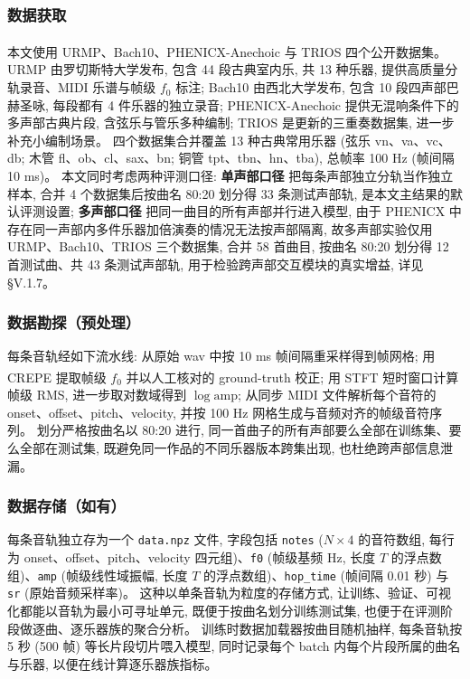 \documentclass[a4paper, UTF8, zihao=-4, fontset=fandol]{ctexart}
\newcommand{\upcite}[1]{\textsuperscript{\cite{#1}}}
\begin{document}
\subsubsection{数据获取}

本文使用 URMP\upcite{urmp}、Bach10\upcite{bach10}、PHENICX-Anechoic 与 TRIOS 四个公开数据集。 URMP 由罗切斯特大学发布, 包含 44 段古典室内乐, 共 13 种乐器, 提供高质量分轨录音、MIDI 乐谱与帧级 $f_0$ 标注; Bach10 由西北大学发布, 包含 10 段四声部巴赫圣咏, 每段都有 4 件乐器的独立录音; PHENICX-Anechoic 提供无混响条件下的多声部古典片段, 含弦乐与管乐多种编制; TRIOS 是更新的三重奏数据集, 进一步补充小编制场景。 四个数据集合并覆盖 13 种古典常用乐器 (弦乐 vn、va、vc、db; 木管 fl、ob、cl、sax、bn; 铜管 tpt、tbn、hn、tba), 总帧率 100 Hz (帧间隔 10 ms)。 本文同时考虑两种评测口径: \textbf{单声部口径} 把每条声部独立分轨当作独立样本, 合并 4 个数据集后按曲名 80:20 划分得 33 条测试声部轨, 是本文主结果的默认评测设置; \textbf{多声部口径} 把同一曲目的所有声部并行进入模型, 由于 PHENICX 中存在同一声部内多件乐器加倍演奏的情况无法按声部隔离, 故多声部实验仅用 URMP、Bach10、TRIOS 三个数据集, 合并 58 首曲目, 按曲名 80:20 划分得 12 首测试曲、共 43 条测试声部轨, 用于检验跨声部交互模块的真实增益, 详见 §V.1.7。

\subsubsection{数据勘探（预处理）}

每条音轨经如下流水线: 从原始 wav 中按 10 ms 帧间隔重采样得到帧网格; 用 CREPE\upcite{crepe} 提取帧级 $f_0$ 并以人工核对的 ground-truth 校正; 用 STFT 短时窗口计算帧级 RMS, 进一步取对数域得到 $\log\mathrm{amp}$; 从同步 MIDI 文件解析每个音符的 onset、offset、pitch、velocity, 并按 100 Hz 网格生成与音频对齐的帧级音符序列。 划分严格按曲名以 80:20 进行, 同一首曲子的所有声部要么全部在训练集、要么全部在测试集, 既避免同一作品的不同乐器版本跨集出现, 也杜绝跨声部信息泄漏。

\subsubsection{数据存储（如有）}

每条音轨独立存为一个 \texttt{data.npz} 文件, 字段包括 \texttt{notes} ($N \times 4$ 的音符数组, 每行为 onset、offset、pitch、velocity 四元组)、\texttt{f0} (帧级基频 Hz, 长度 $T$ 的浮点数组)、\texttt{amp} (帧级线性域振幅, 长度 $T$ 的浮点数组)、\texttt{hop\_time} (帧间隔 0.01 秒) 与 \texttt{sr} (原始音频采样率)。 这种以单条音轨为粒度的存储方式, 让训练、验证、可视化都能以音轨为最小可寻址单元, 既便于按曲名划分训练测试集, 也便于在评测阶段做逐曲、逐乐器族的聚合分析。 训练时数据加载器按曲目随机抽样, 每条音轨按 5 秒 (500 帧) 等长片段切片喂入模型, 同时记录每个 batch 内每个片段所属的曲名与乐器, 以便在线计算逐乐器族指标。
\end{document}
